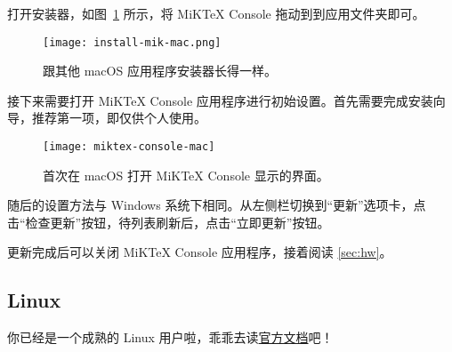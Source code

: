 \begin{widepar}
打开安装器，如图~\ref{fig:install-mik-mac} 所示，将 MiKTeX Console 拖动到到应用文件夹即可。
\end{widepar}

\begin{figure}[htbp]
  \caption{跟其他 macOS 应用程序安装器长得一样。}
  \label{fig:install-mik-mac}
  \texttt{[image: install-mik-mac.png]}
\end{figure}

接下来需要打开 MiKTeX Console 应用程序进行初始设置。首先需要完成安装向导，推荐第一项，即仅供个人使用。

\begin{figure}[htbp]
  \caption{首次在 macOS 打开 MiKTeX Console 显示的界面。}
  \label{fig:miktex-console-mac}
  \texttt{[image: miktex-console-mac]}
\end{figure}

随后的设置方法与 Windows 系统下相同。从左侧栏切换到“更新”选项卡，点击“检查更新”按钮，待列表刷新后，点击“立即更新”按钮。

\begin{widepar}
更新完成后可以关闭 MiKTeX Console 应用程序，接着阅读 \ref{sec:hw}。
\end{widepar}

\subsection{Linux}
\label{subsec:mik-linux}

\begin{widepar}
你已经是一个成熟的 Linux 用户啦，乖乖去读\href{https://miktex.org/howto/install-miktex-unx}{官方文档}吧！
\end{widepar}
